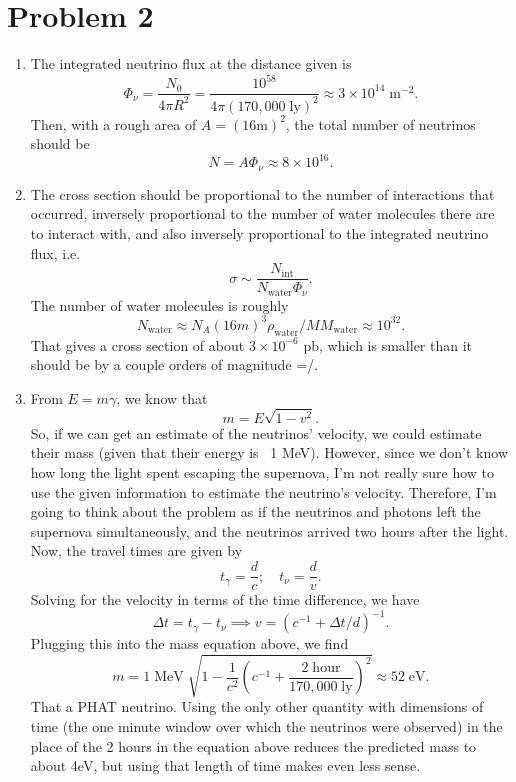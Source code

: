 \documentclass[12pt]{article}
\begin{document}
\section{Problem 2}
\begin{enumerate}[label=(\alph*)]
    \item The integrated neutrino flux at the distance given is
    \[ \Phi_\nu = \frac{N_0}{4\pi R^2} = \frac{10^{58}}{4\pi(170,000\;\text{ly})^2} \approx 3\times10^{14}\;\text{m}^{-2}. \]
    Then, with a rough area of $A = (16 \text{m})^2$, the total number of neutrinos should be
    \[ N = A\Phi_\nu \approx 8\times10^{16}. \]

    \item The cross section should be proportional to the number of interactions that occurred, inversely proportional to the number of water molecules there are to interact with, and also inversely proportional to the integrated neutrino flux, i.e.
    \[ \sigma \sim \frac{N_\text{int}}{N_\text{water}\Phi_\nu}. \]
    The number of water molecules is roughly
    \[ N_\text{water} \approx N_A (16 m)^3 \rho_\text{water} / MM_\text{water} \approx 10^{32}. \]
    That gives a cross section of about $3\times10^{-6}$ pb, which is smaller than it should be by a couple orders of magnitude =/.

    \item From $E = m\gamma$, we know that 
    \[ m = E\sqrt{1 - v^2}. \]
    So, if we can get an estimate of the neutrinos' velocity, we could estimate their mass (given that their energy is ~1 MeV). However, since we don't know how long the light spent escaping the supernova, I'm not really sure how to use the given information to estimate the neutrino's velocity. Therefore, I'm going to think about the problem as if the neutrinos and photons left the supernova simultaneously, and the neutrinos arrived two hours after the light. \\
    Now, the travel times are given by
    \[ t_\gamma = \frac{d}{c}; \quad t_\nu = \frac{d}{v}. \]
    Solving for the velocity in terms of the time difference, we have
    \[ \Delta t = t_\gamma - t_\nu \implies v = \left(c^{-1} + \Delta t / d\right)^{-1}. \]
    Plugging this into the mass equation above, we find
    \[ m = 1\;\text{MeV}\;\sqrt{1 - \frac{1}{c^2}\left(c^{-1} + \frac{2\;\text{hour}}{170,000\;\text{ly}}\right)^2} \approx 52\;\text{eV}. \]
    That a PHAT neutrino. Using the only other quantity with dimensions of time (the one minute window over which the neutrinos were observed) in the place of the 2 hours in the equation above reduces the predicted mass to about 4eV, but using that length of time makes even less sense.
\end{enumerate}
\end{document}
